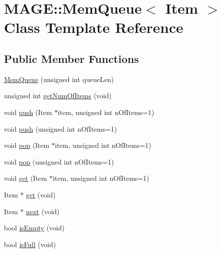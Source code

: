 \hypertarget{class_m_a_g_e_1_1_mem_queue}{\section{M\-A\-G\-E\-:\-:Mem\-Queue$<$ Item $>$ Class Template Reference}
\label{class_m_a_g_e_1_1_mem_queue}
}
\subsection*{Public Member Functions}
\begin{DoxyCompactItemize}
\item 
\hyperlink{class_m_a_g_e_1_1_mem_queue_a6511417af94f01a9aecf95ee6cd287ba}{Mem\-Queue} (unsigned int queue\-Len)
\item 
unsigned int \hyperlink{class_m_a_g_e_1_1_mem_queue_a13da4728554d9321c489d2ac20b97446}{get\-Num\-Of\-Items} (void)
\item 
void \hyperlink{class_m_a_g_e_1_1_mem_queue_ab1a6d50de41fe85f2bc43475ae60561b}{push} (Item $\ast$item, unsigned int n\-Of\-Items=1)
\item 
void \hyperlink{class_m_a_g_e_1_1_mem_queue_a54ad97a49e23e5018c7ca16aa84552f9}{push} (unsigned int n\-Of\-Items=1)
\item 
void \hyperlink{class_m_a_g_e_1_1_mem_queue_a82f6a5e82ef09da2dcc4fb206ee2daae}{pop} (Item $\ast$item, unsigned int n\-Of\-Items=1)
\item 
void \hyperlink{class_m_a_g_e_1_1_mem_queue_a4bdce78622e4b540bb6a70348ee50549}{pop} (unsigned int n\-Of\-Items=1)
\item 
void \hyperlink{class_m_a_g_e_1_1_mem_queue_a3532d34616adfad18e1ef240c3c8e263}{get} (Item $\ast$item, unsigned int n\-Of\-Items=1)
\item 
Item $\ast$ \hyperlink{class_m_a_g_e_1_1_mem_queue_a531e5af24d0d23d6448a4238205162b3}{get} (void)
\item 
Item $\ast$ \hyperlink{class_m_a_g_e_1_1_mem_queue_a84c38188c7243f8200ce06172cb351e7}{next} (void)
\item 
bool \hyperlink{class_m_a_g_e_1_1_mem_queue_ad58057636272de08aca77c2773ce178f}{is\-Empty} (void)
\item 
bool \hyperlink{class_m_a_g_e_1_1_mem_queue_a14d11ba168fec1a6e2a90ae589f7456d}{is\-Full} (void)
\end{DoxyCompactItemize}
